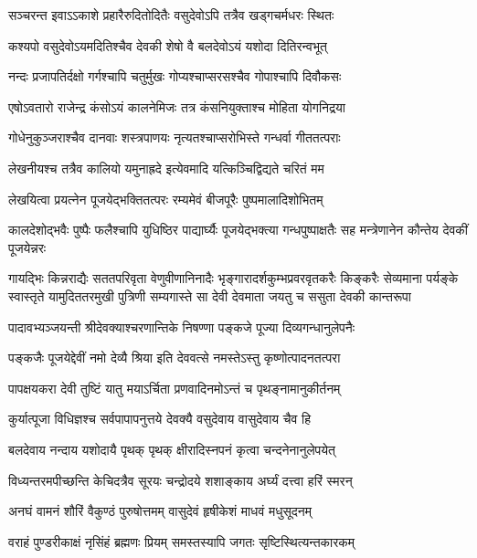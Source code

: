 \twolineshloka
{सञ्चरन्त इवाऽऽकाशे प्रहारैरुदितोदितैः}
{वसुदेवोऽपि तत्रैव खड्गचर्मधरः स्थितः}%

\twolineshloka
{कश्यपो वसुदेवोऽयमदितिश्चैव देवकी}
{शेषो वै बलदेवोऽयं यशोदा दितिरन्वभूत्}%

\twolineshloka
{नन्दः प्रजापतिर्दक्षो गर्गश्चापि चतुर्मुखः}
{गोप्यश्चाप्सरसश्चैव गोपाश्चापि दिवौकसः}%

\twolineshloka
{एषोऽवतारो राजेन्द्र कंसोऽयं कालनेमिजः}
{तत्र कंसनियुक्ताश्च मोहिता योगनिद्रया}%

\twolineshloka
{गोधेनुकुञ्जराश्चैव दानवाः शस्त्रपाणयः}
{नृत्यतश्चाप्सरोभिस्ते गन्धर्वा गीततत्पराः}%

\twolineshloka
{लेखनीयश्च तत्रैव कालियो यमुनाह्रदे}
{इत्येवमादि यत्किञ्चिद्विद्यते चरितं मम}%

\twolineshloka
{लेखयित्वा प्रयत्नेन पूजयेद्भक्तितत्परः}
{रम्यमेवं बीजपूरैः पुष्पमालादिशोभितम्}%

\threelineshloka
{कालदेशोद्भवैः पुष्पैः फलैश्चापि युधिष्ठिर}
{पाद्यार्घ्यैः पूजयेद्भक्त्या गन्धपुष्पाक्षतैः सह}
{मन्त्रेणानेन कौन्तेय देवकीं पूजयेन्नरः}%

\fourlineindentedshloka
{गायद्भिः किन्नराद्यैः सततपरिवृता वेणुवीणानिनादैः}
{भृङ्गारादर्शकुम्भप्रवरवृतकरैः किङ्करैः सेव्यमाना}
{पर्यङ्के स्वास्तृते यामुदिततरमुखी पुत्रिणी सम्यगास्ते}
{सा देवी देवमाता जयतु च ससुता देवकी कान्तरूपा}%


\twolineshloka
{पादावभ्यञ्जयन्ती श्रीदेवक्याश्चरणान्तिके}
{निषण्णा पङ्कजे पूज्या दिव्यगन्धानुलेपनैः}%


\twolineshloka
{पङ्कजैः पूजयेद्देवीं नमो देव्यै श्रिया इति}
{देववत्से नमस्तेऽस्तु कृष्णोत्पादनतत्परा}%


\twolineshloka
{पापक्षयकरा देवी तुष्टिं यातु मयाऽर्चिता}
{प्रणवादिनमोऽन्तं च पृथङ्नामानुकीर्तनम्}%


\twolineshloka
{कुर्यात्पूजा विधिज्ञश्च सर्वपापापनुत्तये}
{देवक्यै वसुदेवाय वासुदेवाय चैव हि}%


\twolineshloka
{बलदेवाय नन्दाय यशोदायै पृथक् पृथक्}
{क्षीरादिस्नपनं कृत्वा चन्दनेनानुलेपयेत्}%


\twolineshloka
{विध्यन्तरमपीच्छन्ति केचिदत्रैव सूरयः}
{चन्द्रोदये शशाङ्काय अर्घ्यं दत्त्वा हरिं स्मरन्}%


\twolineshloka
{अनघं वामनं शौरिं वैकुण्ठं पुरुषोत्तमम्}
{वासुदेवं हृषीकेशं माधवं मधुसूदनम्}%


\twolineshloka
{वराहं पुण्डरीकाक्षं नृसिंहं ब्रह्मणः प्रियम्}
{समस्तस्यापि जगतः सृष्टिस्थित्यन्तकारकम्}%


